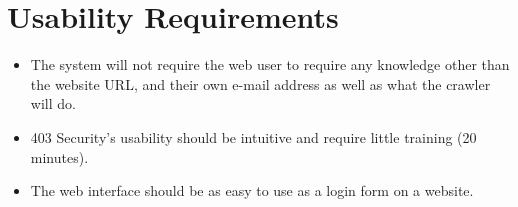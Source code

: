 \section{Usability Requirements}
\begin{itemize}
    \item The system will not require the web user to require any knowledge other than the website URL, and their own e-mail address as well as what the crawler will do.
    \item 403 Security's usability should be intuitive and require little training (20 minutes).
    \item The web interface should be as easy to use as a login form on a website.

\end{itemize}
